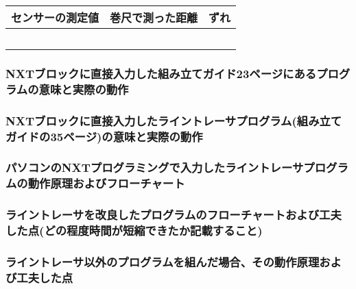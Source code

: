 \begin{tabular}{|c|c|c|}
\hline
センサーの測定値 & 巻尺で測った距離 & ずれ\\
\hline\hline
\hspace*{3cm}&\hspace*{3cm}&\hspace*{3cm}\\
\hline
&&\\
\hline
&&\\
\hline
&&\\
\hline
&&\\
\hline
\end{tabular}


\bigskip\bigskip

\subjikken

\subsubsection*{NXTブロックに直接入力した組み立てガイド23ページにあるプログラムの意味と実際の動作}

\vspace{7cm}

\subjikken

\subsubsection*{NXTブロックに直接入力したライントレーサプログラム(組み立てガイドの35ページ)の意味と実際の動作}

\newpage

\subsubsection*{パソコンのNXTプログラミングで入力したライントレーサプログラムの動作原理およびフローチャート}

\vspace{7cm}

\subsubsection*{ライントレーサを改良したプログラムのフローチャートおよび工夫した点(どの程度時間が短縮できたか記載すること)}

\vspace{7cm}

\subsubsection*{ライントレーサ以外のプログラムを組んだ場合、その動作原理および工夫した点}

